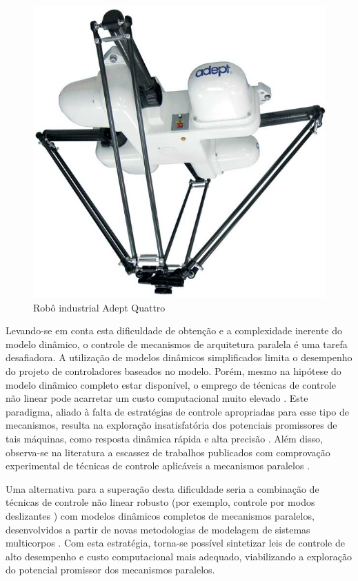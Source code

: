 \documentclass[]{politex}
\begin{document}
\begin{figure}[h]
	\centering
	\includegraphics[scale=0.17]{../figures/theadeptquat.jpg}  
	\caption{Robô industrial Adept Quattro}
	\label{fig:Mecanismo}
\end{figure}

Levando-se em conta esta dificuldade de obtenção e a complexidade inerente do modelo dinâmico, o controle de mecanismos de arquitetura paralela é uma tarefa desafiadora. A utilização de modelos dinâmicos simplificados limita o desempenho do projeto de controladores baseados no modelo. Porém, mesmo na hipótese do modelo dinâmico completo estar disponível, o emprego de técnicas de controle não linear pode acarretar um custo  computacional muito elevado \cite{Craig, Slotini, Zubizarreta}. Este paradigma, aliado à falta de estratégias de controle apropriadas para esse tipo de mecanismos, resulta na exploração insatisfatória dos potenciais promissores de tais máquinas, como resposta dinâmica rápida e alta precisão \cite{Abdellatif}. Além disso, observa-se na literatura a escassez de trabalhos publicados com comprovação experimental de técnicas de controle aplicáveis a mecanismos paralelos \cite{Rynaldo}.
	
    Uma alternativa para a superação desta dificuldade seria a combinação de técnicas de controle não linear robusto (por exemplo, controle por modos deslizantes \cite{Slotini, Utkin}) com modelos dinâmicos completos de mecanismos paralelos, desenvolvidos a partir de novas metodologias de modelagem de sistemas multicorpos \cite{22orsino, Orsino2013, 23orsino, 21orsino}. Com esta estratégia, torna-se possível sintetizar leis de controle de alto desempenho e custo computacional mais adequado, viabilizando a exploração do potencial promissor dos mecanismos paralelos.
\end{document}
